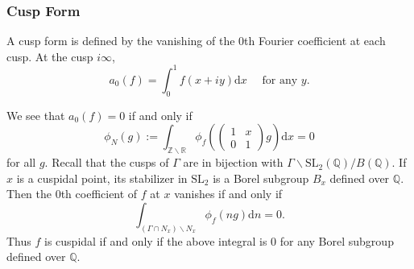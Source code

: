 \documentclass[11pt,english]{smfart}
\theoremstyle{definition}
\theoremstyle{remark}
\begin{document}
\subsubsection{Cusp Form}
A cusp form is defined by the vanishing of the 0th Fourier coefficient at each cusp. At the cusp $ i \infty $,
\[a_{0}(f)=\int_{0}^{1} f(x+i y) \mathrm{d} x \quad \text { for any } y .\]

We see that $ a_{0}(f)=0 $ if and only if
\[\phi_{N}(g):=\int_{\mathbb{Z} \backslash \mathbb{R}} \phi_{f}\left(\left(\begin{array}{cc}
1 & x \\
0 & 1
\end{array}\right) g\right) \mathrm{d} x=0\]
for all $ g $.
Recall that the cusps of $ \Gamma $ are in bijection with $ \Gamma \backslash \mathrm{SL}_{2}(\mathbb{Q})/B(\mathbb{Q})$.
If $ x $ is a cuspidal point, its stabilizer in  $\mathrm{SL}_{2} $ is a Borel subgroup $ B_{x} $ defined over $\mathbb{Q}$.
Then the 0th coefficient of $ f $ at $ x $ vanishes if and only if
\[\int_{\left(\Gamma \cap N_{x}\right) \backslash N_{x}} \phi_{f}(n g) \mathrm{d} n=0 .\]
Thus $ f $ is cuspidal if and only if the above integral is $0$ for any Borel subgroup defined over $\mathbb{Q}$.
\end{document}
